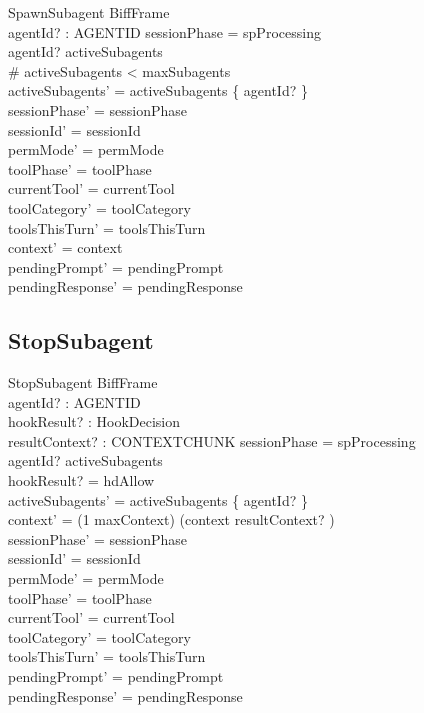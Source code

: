 \documentclass[a4paper,10pt,fleqn]{article}
\begin{document}
\begin{schema}{SpawnSubagent}
  BiffFrame \\
  agentId? : AGENTID
  \where
  sessionPhase = spProcessing \\
  agentId? \notin activeSubagents \\
  \# activeSubagents < maxSubagents \\
  activeSubagents' = activeSubagents \cup \{ agentId? \} \\
  sessionPhase' = sessionPhase \\
  sessionId' = sessionId \\
  permMode' = permMode \\
  toolPhase' = toolPhase \\
  currentTool' = currentTool \\
  toolCategory' = toolCategory \\
  toolsThisTurn' = toolsThisTurn \\
  context' = context \\
  pendingPrompt' = pendingPrompt \\
  pendingResponse' = pendingResponse
\end{schema}

\subsection{StopSubagent}

\begin{schema}{StopSubagent}
  BiffFrame \\
  agentId? : AGENTID \\
  hookResult? : HookDecision \\
  resultContext? : CONTEXTCHUNK
  \where
  sessionPhase = spProcessing \\
  agentId? \in activeSubagents \\
  hookResult? = hdAllow \\
  activeSubagents' = activeSubagents \setminus \{ agentId? \} \\
  context' = (1 \upto maxContext) \dres (context \cat \langle resultContext? \rangle) \\
  sessionPhase' = sessionPhase \\
  sessionId' = sessionId \\
  permMode' = permMode \\
  toolPhase' = toolPhase \\
  currentTool' = currentTool \\
  toolCategory' = toolCategory \\
  toolsThisTurn' = toolsThisTurn \\
  pendingPrompt' = pendingPrompt \\
  pendingResponse' = pendingResponse
\end{schema}
\end{document}
